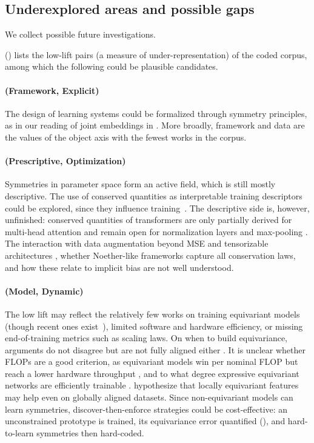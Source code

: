 \documentclass[mathematics,review,submit,moreauthors]{Definitions/mdpi}
\begin{document}
\subsection{Underexplored areas and possible gaps}
We collect possible future investigations.

 () lists the low-lift pairs (a measure of under-representation) of the coded corpus, among which the following could be plausible candidates.

\paragraph{(Framework, Explicit)}
The design of learning systems could be formalized through symmetry principles, as in our reading of joint embeddings in .
More broadly, framework and data are the values of the object axis with the fewest works in the corpus.

\paragraph{(Prescriptive, Optimization)}
Symmetries in parameter space form an active field, which is still mostly descriptive.
The use of conserved quantities as interpretable training descriptors could be explored, since they influence training~\citep{tarmoun2021p3icml}.
The descriptive side is, however, unfinished: conserved quantities of transformers are only partially derived for multi-head attention and remain open for normalization layers and max-pooling \citep{marcotte2025p4icml}.
The interaction with data augmentation beyond MSE and tensorizable architectures \citep{galley2026}, whether Noether-like frameworks capture all conservation laws, and how these relate to implicit bias \citep{zhao2025} are not well understood.

\paragraph{(Model, Dynamic)}
The low lift may reflect the relatively few works on training equivariant models (though recent ones exist~\citep{nordenfors2024,pertigkiozoglou2024,elhag2026}), limited software and hardware efficiency, or missing end-of-training metrics such as scaling laws.
On when to build equivariance, arguments do not disagree but are not fully aligned either \citep{lippmann2025iclr,brehmer2025,shen2026,vadgama2025,rygiel2026,vandegeijn2025}.
It is unclear whether FLOPs are a good criterion, as equivariant models win per nominal FLOP but reach a lower hardware throughput \citep{brehmer2025}, and to what degree expressive equivariant networks are efficiently trainable \citep{pacini2026,elbaz2025}.
\citet{lawrence2026} hypothesize that locally equivariant features may help even on globally aligned datasets.
Since non-equivariant models can learn symmetries, discover-then-enforce strategies \citep{escriche2025,otto2025} could be cost-effective: an unconstrained prototype is trained, its equivariance error quantified (), and hard-to-learn symmetries then hard-coded.
\end{document}
